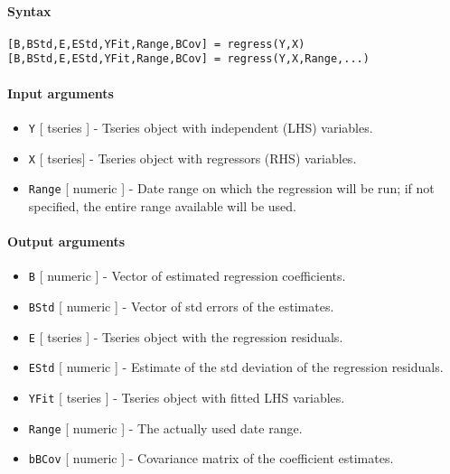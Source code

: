


	\paragraph{Syntax}\label{syntax}

\begin{verbatim}
[B,BStd,E,EStd,YFit,Range,BCov] = regress(Y,X)
[B,BStd,E,EStd,YFit,Range,BCov] = regress(Y,X,Range,...)
\end{verbatim}

\paragraph{Input arguments}\label{input-arguments}

\begin{itemize}
\item
  \texttt{Y} {[} tseries {]} - Tseries object with independent (LHS)
  variables.
\item
  \texttt{X} {[} tseries{]} - Tseries object with regressors (RHS)
  variables.
\item
  \texttt{Range} {[} numeric {]} - Date range on which the regression
  will be run; if not specified, the entire range available will be
  used.
\end{itemize}

\paragraph{Output arguments}\label{output-arguments}

\begin{itemize}
\item
  \texttt{B} {[} numeric {]} - Vector of estimated regression
  coefficients.
\item
  \texttt{BStd} {[} numeric {]} - Vector of std errors of the estimates.
\item
  \texttt{E} {[} tseries {]} - Tseries object with the regression
  residuals.
\item
  \texttt{EStd} {[} numeric {]} - Estimate of the std deviation of the
  regression residuals.
\item
  \texttt{YFit} {[} tseries {]} - Tseries object with fitted LHS
  variables.
\item
  \texttt{Range} {[} numeric {]} - The actually used date range.
\item
  \texttt{bBCov} {[} numeric {]} - Covariance matrix of the coefficient
  estimates.
\end{itemize}

